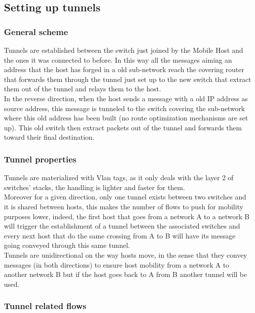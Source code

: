 \documentclass{article}
\begin{document}
\subsection{Setting up tunnels}

\subsubsection{General scheme}
Tunnels are established between the switch just joined by the Mobile
Host and the ones it was connected to before. In this way all the
messages aiming an address that the host has forged in a old
sub-network reach the covering router that forwards them through the
tunnel just set up to the new switch that extract them out of the
tunnel and relays them to the host.\\ 
\newline
In the reverse direction, when the host sends a message with a old IP
address as source address, this message is tunneled to the switch
covering the sub-network where this old address has been built (no
route optimization mechanisms are set up). This old switch then extract
packets out of the tunnel and forwards them toward their final destination.

\subsubsection{Tunnel properties}

Tunnels are materialized with Vlan tags, as it only deals with the
layer 2 of switches' stacks, the handling is lighter and faster for
them.\\ 
\newline
Moreover for a given direction, only one tunnel exists between
two switches and it is shared between hosts, this makes the number of
flows to push for mobility purposes lower, indeed, the first host that
goes from a network A to a network B will trigger the establishment of
a tunnel between the associated switches and every next host that do
the same crossing from A to B will have its message going conveyed
through this same tunnel.\\ 
\newline
Tunnels are unidirectional on the way hosts move, in the sense that
they convey messages (in both directions) to ensure host mobility from
a network A to another network B but if the host goes back to A from B
another tunnel will be used.

\subsubsection{Tunnel related flows}
\end{document}
